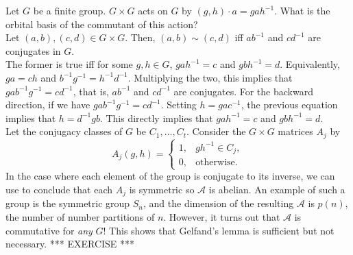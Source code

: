 	\begin{fex}
		Let $G$ be a finite group. $G \times G$ acts on $G$ by $(g,h) \cdot a = gah^{-1}$. What is the orbital basis of the commutant of this action?\\
		Let $(a,b),(c,d) \in G \times G$. Then, $(a,b) \sim (c,d)$ iff $ab^{-1}$ and $cd^{-1}$ are conjugates in $G$.\\
		The former is true iff for some $g,h \in G$, $gah^{-1} = c$ and $gbh^{-1} = d$. Equivalently, $ga = ch$ and $b^{-1}g^{-1} = h^{-1}d^{-1}$. Multiplying the two, this implies that $gab^{-1}g^{-1} = cd^{-1}$, that is, $ab^{-1}$ and $cd^{-1}$ are conjugates. For the backward direction, if we have $gab^{-1}g^{-1} = cd^{-1}$. Setting $h = gac^{-1}$, the previous equation implies that $h = d^{-1}gb$. This directly implies that $gah^{-1} = c$ and $gbh^{-1} = d$.\\
		Let the conjugacy classes of $G$ be $C_1,\ldots,C_t$. Consider the $G \times G$ matrices $A_j$ by
		\[ A_j(g,h) = \begin{cases} 1, & gh^{-1} \in C_j, \\ 0, & \text{otherwise.} \end{cases} \]
		In the case where each element of the group is conjugate to its inverse, we can use  to conclude that each $A_j$ is symmetric so $\mathcal{A}$ is abelian. An example of such a group is the symmetric group $S_n$, and the dimension of the resulting $\mathcal{A}$ is $p(n)$, the number of number partitions of $n$. However, it turns out that $\mathcal{A}$ is commutative for \emph{any} $G$! This shows that Gelfand's lemma is sufficient but not necessary. *** EXERCISE ***
	\end{fex}

